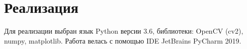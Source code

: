 \section{Реализация}

Для реализации выбран язык Python версии 3.6, библиотеки: OpenCV (cv2), numpy, matplotlib. Работа велась с помощью IDE JetBrains PyCharm 2019.
